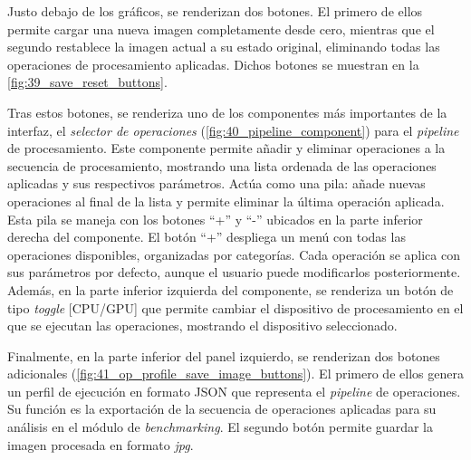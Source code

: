 \noindent
\begin{minipage}[t]{0.49\textwidth}
    \vspace{0pt}
    \setlength{\parindent}{2em}
    Justo debajo de los gráficos, se renderizan dos botones. El primero de ellos permite cargar una nueva imagen 
    completamente desde cero, mientras que el segundo restablece la imagen actual a su estado original, eliminando 
    todas las operaciones de procesamiento aplicadas. Dichos botones se muestran en la \autoref{fig:39_save_reset_buttons}.
    \vspace{1em}

    Tras estos botones, se renderiza uno de los componentes más importantes de la interfaz, el \textit{selector de operaciones}
    (\autoref{fig:40_pipeline_component}) para el \textit{pipeline} de procesamiento. Este componente permite añadir y eliminar 
    operaciones a la secuencia de procesamiento, mostrando una lista ordenada de las operaciones aplicadas y sus respectivos parámetros.
    Actúa como una pila: añade nuevas operaciones al final de la lista y permite eliminar la última operación aplicada. Esta pila se maneja 
    con los botones ``+'' y ``-'' ubicados en la parte inferior derecha del componente. El botón ``+'' despliega un menú con todas las operaciones
    disponibles, organizadas por categorías. Cada operación se aplica con sus parámetros por defecto, aunque el usuario puede modificarlos 
    posteriormente. Además, en la parte inferior izquierda del componente, se renderiza un botón de tipo \textit{toggle} [CPU/GPU] que permite 
    cambiar el dispositivo de procesamiento en el que se ejecutan las operaciones, mostrando el dispositivo seleccionado.
    \vspace{1em}

    Finalmente, en la parte inferior del panel izquierdo, se renderizan dos botones adicionales (\autoref{fig:41_op_profile_save_image_buttons}).
    El primero de ellos genera un perfil de ejecución en formato JSON que representa el \textit{pipeline} de operaciones. Su 
    función es la exportación de la secuencia de operaciones aplicadas para su análisis en el módulo de \textit{benchmarking}. 
    El segundo botón permite guardar la imagen procesada en formato \textit{jpg}.
\end{minipage}\hfill
